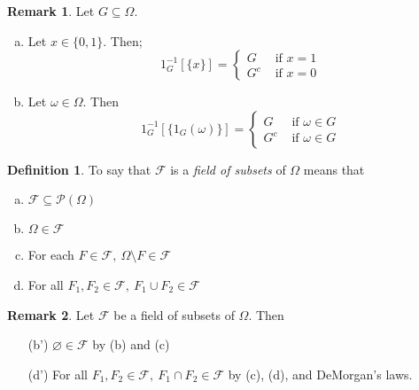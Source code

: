 \documentclass{article}
\theoremstyle{definition}
\newtheorem*{definition}{Definition}
\newtheorem*{remark}{Remark}
\begin{document}
\begin{remark}
Let $G \subseteq \Omega$.
\begin{enumerate}[(a)]
    \item Let $x \in \{0,1\}$. Then;
    $$1^{-1}_G [\{x\}] = \begin{cases}G &\text{\ \ if\ } x = 1\\ G^c &\text{\ \ if\ } x= 0\end{cases}$$
    \item Let $\omega \in \Omega$. Then
    $$1^{-1}_G[\{1_G(\omega)\}] = \begin{cases} G &\text{ if } \omega \in G \\ G^c &\text{ if } \omega \in G \end{cases}$$
\end{enumerate}
\end{remark}

\begin{definition}
To say that $\mathscr{F}$ is a \emph{field of subsets} of $\Omega$ means that
\begin{enumerate}[(a)]
    \item $\mathscr{F} \subseteq \mathcal{P}(\Omega)$
    \item $\Omega \in \mathscr{F}$
    \item For each $F \in \mathscr{F},\ \Omega \setminus F \in \mathscr{F}$
    \item For all $F_1, F_2 \in \mathscr{F},\ F_1 \cup F_2 \in \mathscr{F}$
\end{enumerate}
\end{definition}

\begin{remark}
Let $\mathscr{F}$ be a field of subsets of $\Omega$. Then
\begin{enumerate}
    \item[(b')] $\varnothing \in \mathscr{F}$ by (b) and (c)
    \item[(d')] For all $F_1, F_2 \in \mathscr{F},\ F_1 \cap F_2 \in \mathscr{F}$ by (c), (d), and DeMorgan's laws.
\end{enumerate}
\end{remark}
\end{document}
